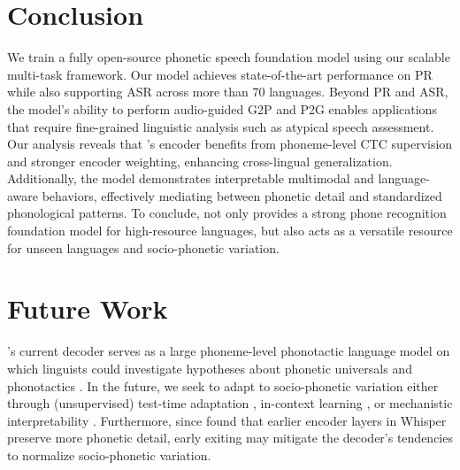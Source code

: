 \section{Conclusion}

We train a fully open-source phonetic speech foundation model \POWSM using our scalable multi-task framework.
Our model achieves state-of-the-art performance on PR while also supporting ASR across more than 70 languages. 
Beyond PR and ASR, the model's ability to perform audio-guided G2P and P2G enables applications that require fine-grained linguistic analysis such as atypical speech assessment.
Our analysis reveals that \POWSM's encoder benefits from phoneme-level CTC supervision and stronger encoder weighting, enhancing cross-lingual generalization.
Additionally, the model demonstrates interpretable multimodal and language-aware behaviors, effectively mediating between phonetic detail and standardized phonological patterns.
To conclude, \POWSM not only provides a strong phone recognition foundation model for high-resource languages, but also acts as a versatile resource for unseen languages and socio-phonetic variation.

\section{Future Work}
\POWSM's current decoder serves as a large phoneme-level phonotactic language model on which linguists could investigate hypotheses about phonetic universals \citep{chodroff2024voxangeles,chodroff2025phonetic} and phonotactics \citep{shim2024phonotactic,pimentel2020phonotactic}.
In the future, we seek to adapt to socio-phonetic variation either through (unsupervised) test-time adaptation \citep{lin22b_interspeech}, in-context learning \citep{roll2025context,wang2024can}, or mechanistic interpretability \citep{tang2024language}.
Furthermore, since \citet{shim2025languages} found that earlier encoder layers in Whisper preserve more phonetic detail, early exiting may mitigate the decoder's tendencies to normalize socio-phonetic variation.

